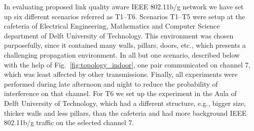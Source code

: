 \documentclass[11pt,draftclsnofoot,journal,onecolumn]{IEEEtran}
\begin{document}
In evaluating proposed link quality aware IEEE 802.11b/g network we have set up six different scenarios referred as T1--T6. Scenarios T1--T5 were setup at the cafeteria of Electrical Engineering, Mathematics and Computer Science department of Delft University of Technology. This environment was chosen purposefully, since it contained many walls, pillars, doors, etc., which presents a challenging propagation environment. In all but one scenario, described below with the help of Fig.~\ref{fig:topology_indoor}, one pair communicated on channel 7, which was least affected by other transmissions. Finally, all experiments were performed during late afternoon and night to reduce the probability of interference on that channel. For T6 we set up the experiment in the Aula of Delft University of Technology, which had a different structure, e.g., bigger size, thicker walls and less pillars, than the cafeteria and had more background IEEE 802.11b/g traffic on the selected channel 7. 
\end{document}
